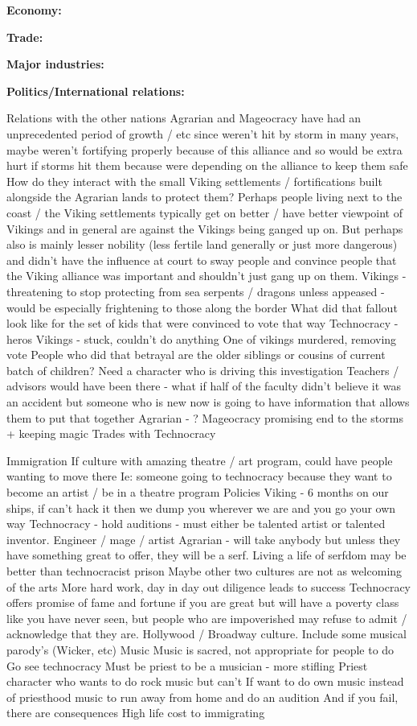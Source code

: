 \documentclass[blue]{GL2020}
\begin{document}
\textbf{Economy:}

\textbf{Trade:}

\textbf{Major industries:}

\textbf{Politics/International relations:}

Relations with the other nations
Agrarian and Mageocracy have had an unprecedented period of growth / etc since weren’t hit by storm in many years, maybe weren’t fortifying properly because of this alliance and so would be extra hurt if storms hit them because were depending on the alliance to keep them safe
How do they interact with the small Viking settlements / fortifications built alongside the Agrarian lands to protect them?  Perhaps people living next to the coast / the Viking settlements typically get on better / have better viewpoint of Vikings and in general are against the Vikings being ganged up on.  But perhaps also is mainly lesser nobility (less fertile land generally or just more dangerous) and didn’t have the influence at court to sway people and convince people that the Viking alliance was important and shouldn’t just gang up on them.  
Vikings - threatening to stop protecting from sea serpents / dragons unless appeased - would be especially frightening to those along the border
What did that fallout look like for the set of kids that were convinced to vote that way
Technocracy - heros
Vikings - stuck, couldn’t do anything
One of vikings murdered, removing vote
People who did that betrayal are the older siblings or cousins of current batch of children?
Need a character who is driving this investigation
Teachers / advisors would have been there - what if half of the faculty didn’t believe it was an accident but someone who is new now is going to have information that allows them to put that together
Agrarian - ?
Mageocracy promising end to the storms + keeping magic 
Trades with Technocracy

Immigration
If culture with amazing theatre / art program, could have people wanting to move there
Ie: someone going to technocracy because they want to become an artist / be in a theatre program
Policies
Viking - 6 months on our ships, if can’t hack it then we dump you wherever we are and you go your own way
Technocracy - hold auditions - must either be talented artist or talented inventor.  Engineer / mage / artist
Agrarian - will take anybody but unless they have something great to offer, they will be a serf.  Living a life of serfdom may be better than technocracist prison
Maybe other two cultures are not as welcoming of the arts
More hard work, day in day out diligence leads to success
Technocracy offers promise of fame and fortune if you are great but will have a poverty class like you have never seen, but people who are impoverished may refuse to admit / acknowledge that they are.  Hollywood / Broadway culture.  Include some musical parody’s (Wicker, etc)
Music
Music is sacred, not appropriate for people to do
Go see technocracy 
Must be priest to be a musician - more stifling
Priest character who wants to do rock music but can’t
If want to do own music instead of priesthood music to run away from home and do an audition
And if you fail, there are consequences
High life cost to immigrating
\end{document}
